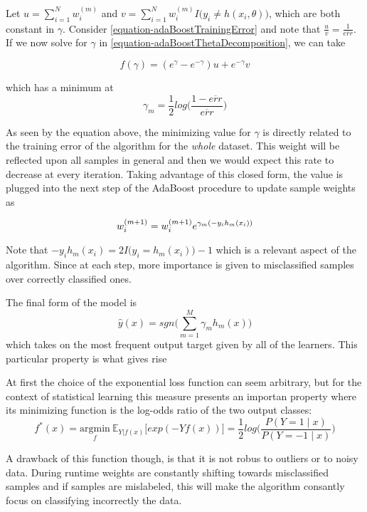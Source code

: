 \documentclass{article}%
\newcommand{\Expect}{{\mathbb{E}}}
\theoremstyle{definition}
\begin{document}
Let $u = \sum_{i=1}^{N}  w_i^{(m)}$ and $v = \sum_{i=1}^{N}  w_i^{(m)} I \big( y_i \neq h(x_i,\theta)   \big) $, which are both constant in $\gamma$. Consider \ref{equation-adaBoostTrainingError} and note that $\frac{u}{v} = \frac{1}{\overline{err}}$. If we now solve for $\gamma$ in \ref{equation-adaBoostThetaDecomposition}, we can take

\begin{equation} \label{equation-adaBoostBetaMinimization}
f(\gamma) = ( e^{\gamma} - e^{-\gamma}) u +  e^{-\gamma}v
\end{equation}

which has a minimum at 
\begin{equation}
\gamma_{m} = \frac{1}{2} log\big( \frac{1 - \overline{err} }{ \overline{err} }  \big)
\end{equation}

As seen by the equation above, the minimizing value for $\gamma$ is directly related to the training error of the algorithm for the \textit{whole} dataset. This weight will be reflected upon all samples in general and then we would expect this rate to decrease at every iteration.  Taking advantage of this closed form, the value is plugged into the next step of the AdaBoost procedure to update sample weights as

\begin{equation}
w_i^{(m+1)} =   w_i^{(m+1)} e^{\gamma_m(-y_i h_m(x_i))} \\
\end{equation} 

Note that $-y_i h_m(x_i) = 2I \big( y_i = h_m(x_i)   \big) -1$ which is a relevant aspect of the algorithm. Since at each step, more importance is given to misclassified samples over correctly classified ones. 

The final form of the model is
$$  \hat{y}(x) = sgn\big(  \sum_{m=1}^{M} \gamma_m h_m(x) \big)$$ which takes on the most frequent output target given by all of the learners. This particular property is what gives rise

At first the choice of the exponential loss function can seem arbitrary, but for the context of statistical learning this measure presents an importan property where its minimizing function is the log-odds ratio of the two output classes:
$$f^*(x) = \underset{f}{\mathrm{argmin}} \  \Expect_{Y | f(x)}\big[ exp(-Yf(x))  \big] = \frac{1}{2}
log\big( \frac{ P(Y=1 \mid x) }{ P(Y=-1 \mid x) }  \big) $$



A drawback of this function though, is that it is not robus to outliers or to noisy data. During runtime weights are constantly shifting towards misclassified samples and if samples are mislabeled, this will make the algorithm consantly focus on classifying incorrectly the data. 
\end{document}
